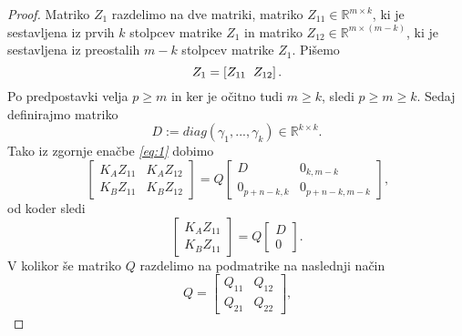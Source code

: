 \documentclass[mat1]{article}
\theoremstyle{definition}
\begin{document}
\begin{proof}
Matriko $Z_1$ razdelimo na dve matriki, matriko $Z_{11} \in \mathbb{R}^{m \times k}$, ki je sestavljena iz prvih $k$ stolpcev matrike $Z_1$ in matriko $Z_{12} \in \mathbb{R}^{m \times (m-k)}$, ki je sestavljena iz preostalih $m-k$ stolpcev matrike $Z_1$. Pišemo $$Z_1 = \left[ Z_{11} \hspace{2mm} Z_{12} \right] \text{.}$$
Po predpostavki velja $p \geq m$ in ker je očitno tudi $m \geq k$, sledi $p \geq m \geq k$. Sedaj definirajmo matriko 
$$ D := diag(\gamma_1,..., \gamma_k) \in \mathbb{R}^{k \times k} \text{.}
$$
Tako iz zgornje enačbe \textit{\eqref{eq:1}} dobimo
\begin{equation}
\begin{bmatrix}
K_A Z_{11} & K_A Z_{12} \\ 
K_B Z_{11} & K_B Z_{12}
\end{bmatrix} = Q
\begin{bmatrix}
D & 0_{k, m-k} \\ 
0_{p+n-k, k} & 0_{p+n-k, m-k} 
\end{bmatrix} \text{,} \label{eq:2}
\end{equation}
od koder sledi
$$
\begin{bmatrix}
K_A Z_{11} \\ 
K_B Z_{11}
\end{bmatrix} = Q
\begin{bmatrix}
D \\ 
0
\end{bmatrix} \text{.}
$$
V kolikor še matriko $Q$ razdelimo na podmatrike na naslednji način
$$ Q = 
\begin{bmatrix}
Q_{11} & Q_{12} \\ 
Q_{21} & Q_{22}
\end{bmatrix} \text{,}
$$
\end{proof}
\end{document}
